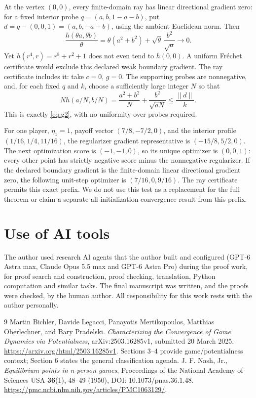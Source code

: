 \documentclass[11pt,a4paper]{article}
\begin{document}
At the vertex \((0,0)\), every finite-domain ray has linear directional
gradient zero: for a fixed interior probe \(q=(a,b,1-a-b)\), put
\(d=q-(0,0,1)=(a,b,-a-b)\), using the ambient Euclidean norm. Then
\[
\frac{h(\theta a,\theta b)}{\theta}
=\theta(a^2+b^2)+\sqrt\theta\,\frac{b^2}{\sqrt a}
\longrightarrow0.
\]
Yet \(h(r^4,r)=r^8+r^2+1\) does not even tend to \(h(0,0)\).
A uniform Fr\'echet certificate would exclude this declared weak boundary
gradient. The ray certificate includes it: take \(c=0\), \(g=0\).
The supporting probes are nonnegative, and, for each fixed \(q\) and \(k\),
choose a sufficiently large integer \(N\) so that
\[
N h(a/N,b/N)=\frac{a^2+b^2}{N}+\frac{b^2}{\sqrt{aN}}
\le\frac{\|d\|}{k}.
\]
This is exactly \eqref{eq:g2}, with no uniformity over probes required.

For one player,
\(\eta_1=1\), payoff vector \((7/8,-7/2,0)\), and the interior profile
\((1/16,1/4,11/16)\), the regularizer gradient representative is
\((-15/8,5/2,0)\). The next optimization score is \((-1,-1,0)\),
so its unique optimizer is \((0,0,1)\): every other point has strictly
negative score minus the nonnegative regularizer. If the declared boundary
gradient is the finite-domain linear directional gradient zero, the following
unit-step optimizer is \((7/16,0,9/16)\). The ray certificate permits this exact
prefix. We do not use this test as a replacement for the full theorem or claim
a separate all-initialization convergence result from this prefix.

\section*{Use of AI tools}
The author used research AI agents that the author built and configured (GPT-6 Astra max,
Claude Opus 5.5 max and GPT-6 Astra Pro) during the proof work, for proof search and
construction, proof checking, translation, Python computation and similar tasks. The final
manuscript was written, and the proofs were checked, by the human author. All responsibility
for this work rests with the author personally.

\begin{thebibliography}{9}
Martin Bichler, Davide Legacci, Panayotis Mertikopoulos,
Matthias Oberlechner, and Bary Pradelski.
\emph{Characterizing the Convergence of Game Dynamics via Potentialness},
arXiv:2503.16285v1, submitted 20 March 2025.
\url{https://arxiv.org/html/2503.16285v1}.
Sections 3--4 provide game/potentialness context; Section 6 states the general
classification agenda.
J. F. Nash, Jr., \emph{Equilibrium points in n-person games},
Proceedings of the National Academy of Sciences USA \textbf{36}(1), 48--49
(1950), DOI: 10.1073/pnas.36.1.48.
\url{https://pmc.ncbi.nlm.nih.gov/articles/PMC1063129/}.
\end{thebibliography}
\end{document}
